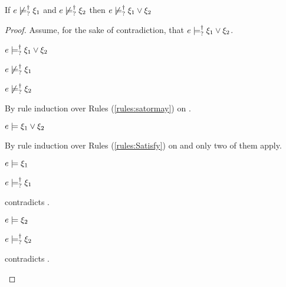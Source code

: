\begin{lem}
  \label{lem:or-nn-satisfy}
  If $e \not\models_{?}^{\dag} \xi_1$ and $e \not\models_{?}^{\dag} \xi_2$ then $e \not\models_{?}^{\dag} \xi_1 \vee \xi_2$
\end{lem}
\begin{proof}
  Assume, for the sake of contradiction, that $e \models_{?}^{\dag} \xi_1 \vee \xi_2$.
\begin{pfsteps*}
\item $e \models_{?}^{\dag} \xi_1 \vee \xi_2$  
\item $e \not\models_{?}^{\dag} \xi_1$  
\item $e \not\models_{?}^{\dag} \xi_2$  
\end{pfsteps*}
By rule induction over Rules (\ref{rules:satormay}) on .
\begin{byCases}

\item[\text{(\ref{rule:CSMSSat})}]
  \begin{pfsteps*}
  \item $e \models \xi_1 \vee \xi_2$  
  \end{pfsteps*}
  By rule induction over Rules (\ref{rules:Satisfy}) on  and only two of them apply.
  \begin{byCases}

  \item[\text{(\ref{rule:CSOr1})}]
    \begin{pfsteps*}
    \item $e \models \xi_1$  
    \item $e \models_{?}^{\dag} \xi_1$  
    \end{pfsteps*}
     contradicts .

  \item[\text{(\ref{rule:CSOr2})}]
    \begin{pfsteps*}
    \item $e \models \xi_2$  
    \item $e \models_{?}^{\dag} \xi_2$  
    \end{pfsteps*}
     contradicts .


\end{byCases}
\end{byCases}
\end{proof}
